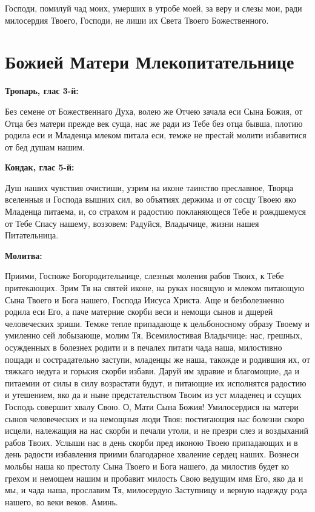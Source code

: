 Господи, помилуй чад моих, умерших в утробе моей, за веру и слезы мои, ради милосердия Твоего, Господи, не лиши их Света Твоего Божественного.



 

\section{Божией Матери Млекопитательнице}
 
\bfseries Тропарь, глас 3-й:\normalfont{}


Без семене от Божественнаго Духа, волею же Отчею зачала еси Сына Божия, от Отца без матери прежде век суща, нас же ради из Тебе без отца бывша, плотию родила еси и Младенца млеком питала еси, темже не престай молити избавитися от бед душам нашим.


\medskip
\bfseries Кондак, глас 5-й:\normalfont{}


Душ наших чувствия очистиши, узрим на иконе таинство преславное, Творца вселенныя и Господа вышних сил, во объятиях держима и от сосцу Твоею яко Младенца питаема, и, со страхом и радостию покланяющеся Тебе и рождшемуся от Тебе Спасу нашему, воззовем: Радуйся, Владычице, жизни нашея Питательница.


\medskip
\bfseries Молитва:\normalfont{}


Приими, Госпоже Богородительнице, слезныя моления рабов Твоих, к Тебе притекающих. Зрим Тя на святей иконе, на руках носящую и млеком питающую Сына Твоего и Бога нашего, Господа Иисуса Христа. Аще и безболезненно родила еси Его, а паче матерние скорби веси и немощи сынов и дщерей человеческих зриши. Темже тепле припадающе к цельбоносному образу Твоему и умиленно сей лобызающе, молим Тя, Всемилостивая Владычице: нас, грешных, осужденных в болезнех родити и в печалех питати чада наша, милостивно пощади и сострадательно заступи, младенцы же наша, такожде и родившия их, от тяжкаго недуга и горькия скорби избави. Даруй им здравие и благомощие, да и питаемии от силы в силу возрастати будут, и питающие их исполнятся радостию и утешением, яко да и ныне предстательством Твоим из уст младенец и ссущих Господь совершит хвалу Свою. О, Мати Сына Божия! Умилосердися на матери сынов человеческих и на немощныя люди Твоя: постигающия нас болезни скоро исцели, належащия на нас скорби и печали утоли, и не презри слез и воздыханий рабов Твоих. Услыши нас в день скорби пред иконою Твоею припадающих и в день радости избавления приими благодарное хваление сердец наших. Вознеси мольбы наша ко престолу Сына Твоего и Бога нашего, да милостив будет ко грехом и немощем нашим и пробавит милость Свою ведущим имя Его, яко да и мы, и чада наша, прославим Тя, милосердую Заступницу и верную надежду рода нашего, во веки веков. Аминь.

